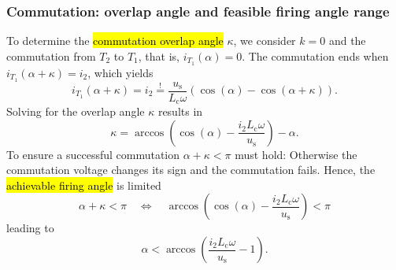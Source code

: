 \begin{frame}[c]
    \frametitle{Commutation: overlap angle and feasible firing angle range}
    To determine the \hl{commutation overlap angle} $\kappa$, we consider $k=0$ and the commutation from $T_2$ to $T_1$, that is, $i_{T_1}(\alpha) = 0$. The commutation ends when $i_{T_1}(\alpha+\kappa) = i_2$, which yields
    \begin{equation}
        i_{T_1}(\alpha+\kappa) = i_2 \stackrel{!}{=} \frac{u_\mathrm{s}}{L_\mathrm{c}\omega}\left(\cos(\alpha)-\cos(\alpha+\kappa)\right).
    \end{equation}
    Solving for the overlap angle $\kappa$ results in
    \begin{equation}
        \kappa = \arccos\left(\cos(\alpha) - \frac{i_2L_\mathrm{c}\omega}{u_\mathrm{s}}\right) - \alpha.
        \label{eq:overlap_angle_M2C}
    \end{equation}
    To ensure a successful commutation $\alpha+\kappa < \pi$ must hold: Otherwise the commutation voltage changes its sign and the commutation fails. Hence, the \hl{achievable firing angle} is limited
    \begin{equation}
        \alpha + \kappa  < \pi \quad \Leftrightarrow \quad \arccos\left(\cos(\alpha) - \frac{i_2L_\mathrm{c}\omega}{u_\mathrm{s}}\right) < \pi 
    \end{equation}
    leading to 
    \begin{equation}
        \alpha < \arccos\left( \frac{i_2L_\mathrm{c}\omega}{u_\mathrm{s}} - 1\right).
    \end{equation}
\end{frame}

